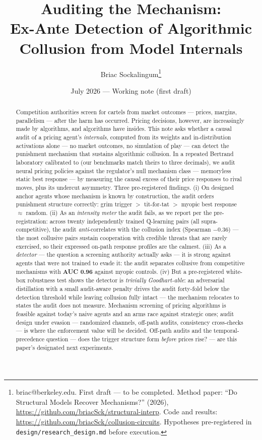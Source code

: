 \documentclass[11pt]{article}
\title{Auditing the Mechanism:\\
\large Ex-Ante Detection of Algorithmic Collusion from Model Internals}
\author{Briac Sockalingum\thanks{briac@berkeley.edu. First draft --- to be
completed. Method paper: ``Do Structural Models Recover Mechanisms?''
(2026), \url{https://github.com/briacSck/structural-interp}. Code and
results: \url{https://github.com/briacSck/collusion-circuits}. Hypotheses
pre-registered in \texttt{design/research\_design.md} before execution.}}
\date{July 2026 --- Working note (first draft)}
\begin{document}
\maketitle

\begin{abstract}
\noindent Competition authorities screen for cartels from market outcomes
--- prices, margins, parallelism --- after the harm has occurred. Pricing
decisions, however, are increasingly made by algorithms, and algorithms
have insides. This note asks whether a causal audit of a pricing agent's
\emph{internals}, computed from its weights and in-distribution activations
alone --- no market outcomes, no simulation of play --- can detect the
punishment mechanism that sustains algorithmic collusion. In a repeated
Bertrand laboratory calibrated to \citet{calvano2020} (our benchmarks match
theirs to three decimals), we audit neural pricing policies against the
regulator's null mechanism class --- memoryless static best response ---
by measuring the causal excess of their price responses to rival moves,
plus its undercut asymmetry. Three pre-registered findings. (i) On designed
anchor agents whose mechanism is known by construction, the audit orders
punishment structure correctly: grim trigger $>$ tit-for-tat $>$ myopic
best response $\approx$ random. (ii) As an \emph{intensity meter} the audit
fails, as we report per the pre-registration: across twenty independently
trained Q-learning pairs (all supra-competitive), the audit
\emph{anti}-correlates with the collusion index (Spearman $-0.36$) --- the
most collusive pairs sustain cooperation with credible threats that are
rarely exercised, so their expressed on-path response profiles are the
calmest. (iii) As a \emph{detector} --- the question a screening authority
actually asks --- it is strong against agents that were not trained to
evade it: the audit separates collusive from competitive mechanisms with
\textbf{AUC 0.96} against myopic controls. (iv) But a pre-registered
white-box robustness test shows the detector is \emph{trivially
Goodhart-able}: an adversarial distillation with a small audit-aware
penalty drives the audit forty-fold below the detection threshold while
leaving collusion fully intact --- the mechanism relocates to states the
audit does not measure. Mechanism screening of pricing algorithms is
feasible against today's naive agents and an arms race against strategic
ones; audit design under evasion --- randomized channels, off-path audits,
consistency cross-checks --- is where the enforcement value will be
decided. Off-path audits and the temporal-precedence question --- does the
trigger structure form \emph{before} prices rise? --- are this paper's
designated next experiments.
\end{abstract}
\end{document}
